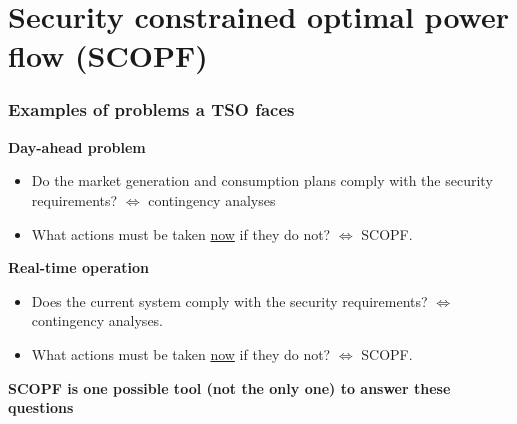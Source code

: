 \documentclass[compress]{beamer}
\begin{document}
\section[SCOPF]{Security constrained optimal power flow (SCOPF)}
\begin{frame}
  \frametitle{Examples of problems a TSO faces}
\textbf{Day-ahead problem}
  \begin{itemize}
  \item Do the market generation and consumption plans comply with the security requirements? $\Leftrightarrow$ contingency analyses
  \item What actions must be taken \underline{now} if they do not? $\Leftrightarrow$ SCOPF.
  \end{itemize}

\textbf{Real-time operation}
  \begin{itemize}
  \item Does the current system comply with the security requirements? $\Leftrightarrow$ contingency analyses.
  \item What actions must be taken \underline{now} if they do not? $\Leftrightarrow$ SCOPF.
  \end{itemize}

\textbf{SCOPF is one possible tool (not the only one) to answer these questions}
\end{frame}
\end{document}
